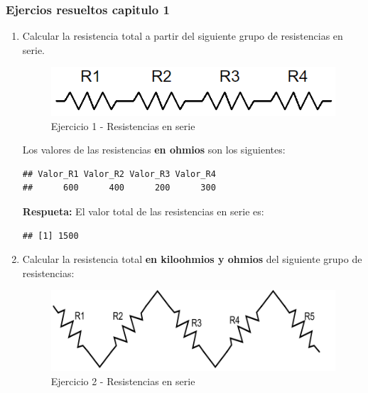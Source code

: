 \documentclass[10pt]{article}\usepackage[]{graphicx}\usepackage[]{color}
\makeatletter
\newenvironment{kframe}{%
 \def\at@end@of@kframe{}%
 \ifinner\ifhmode%
  \def\at@end@of@kframe{\end{minipage}}%
  \begin{minipage}{\columnwidth}%
 \fi\fi%
 \def\FrameCommand##1{\hskip\@totalleftmargin \hskip-\fboxsep
 \colorbox{shadecolor}{##1}\hskip-\fboxsep
     \hskip-\linewidth \hskip-\@totalleftmargin \hskip\columnwidth}%
 \MakeFramed {\advance\hsize-\width
   \@totalleftmargin\z@ \linewidth\hsize
   \@setminipage}}%
 {\par\unskip\endMakeFramed%
 \at@end@of@kframe}
\newenvironment{knitrout}{}{} %
\makeatother
\begin{document}
	\subsubsection{Ejercios resueltos capitulo 1}
	\begin{enumerate}
\item Calcular la resistencia total a partir del siguiente grupo de resistencias en serie.\\

\begin{figure}[h!] %
	\centering
		\includegraphics[scale=0.6]{Imagenes/cap1_ej1_res_serie.png}   
	\caption{Ejercicio 1 - Resistencias en serie} \label{fig:cap1_ej1_res_serie.png}
\end{figure}

Los valores de las resistencias \textbf{en ohmios}  son los siguientes:
\begin{knitrout}
\color{fgcolor}\begin{kframe}
\begin{verbatim}
## Valor_R1 Valor_R2 Valor_R3 Valor_R4 
##      600      400      200      300
\end{verbatim}
\end{kframe}
\end{knitrout}

\textbf{Respueta: }El valor total de las resistencias en serie es:
\begin{knitrout}
\color{fgcolor}\begin{kframe}
\begin{verbatim}
## [1] 1500
\end{verbatim}
\end{kframe}
\end{knitrout}

\item Calcular la resistencia total \textbf{en kiloohmios y ohmios} del siguiente grupo de resistencias:\\

\begin{figure}[h!] %
	\centering
		\includegraphics[scale=1.5]{Imagenes/cap1_ej2_res_serie.png}   
	\caption{Ejercicio 2 - Resistencias en serie} \label{fig:cap1_ej2_res_serie.png}
\end{figure}


\end{enumerate}
\end{document}
